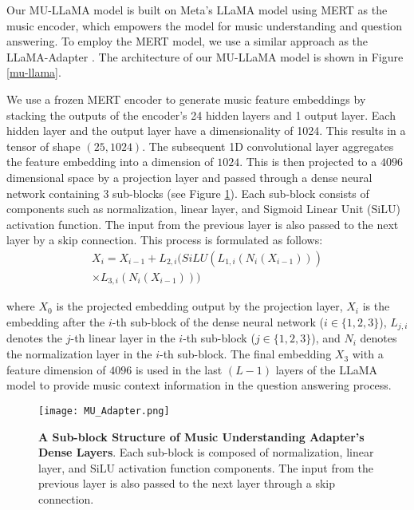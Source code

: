 \documentclass{article}
\begin{document}
\noindent
Our MU-LLaMA model is built on Meta's LLaMA\cite{touvron2023llama,touvron2023llama2} model using MERT \cite{li2023mert} as the music encoder, which empowers the model for music understanding and question answering. To employ the MERT model, we use a similar approach as the LLaMA-Adapter \cite{zhang2023llamaadapter}. The architecture of our MU-LLaMA model is shown in Figure \ref{mu-llama}.

We use a frozen MERT encoder to generate music feature embeddings by stacking the outputs of the encoder's 24 hidden layers and 1 output layer. Each hidden layer and the output layer have a dimensionality of 1024. This results in a tensor of shape $(25, 1024)$. The subsequent 1D convolutional layer aggregates the feature embedding into a dimension of $1024$.  This is then projected to a $4096$ dimensional space by a projection layer and passed through a dense neural network containing 3 sub-blocks (see Figure \ref{mu-adapter}). Each sub-block consists of components such as normalization, linear layer, and Sigmoid Linear Unit (SiLU) activation function. The input from the previous layer is also passed to the next layer by a skip connection. This process is formulated as follows:
\vspace{-0.3cm}
\begin{multline*}
    X_{i} = X_{i-1} + L_{2,i}(SiLU(L_{1,i}(N_{i}(X_{i-1}))) \\ \times L_{3,i}(N_{i}(X_{i-1})))
\end{multline*}
\vspace{-0.5cm}

\noindent
where $X_0$ is the projected embedding output by the projection layer, $X_{i}$ is the embedding after the $i$-th sub-block of the dense neural network ($i\in\{1,2,3\}$), $L_{j,i}$ denotes the $j$-th linear layer in the $i$-th sub-block ($j\in\{1,2,3\}$), and $N_i$ denotes the normalization layer in the $i$-th sub-block. The final embedding $X_3$ with a feature dimension of $4096$ is used in the last $(L-1)$ layers of the LLaMA model to provide music context information in the question answering process.

\vspace{-0.2cm}
\begin{figure}[H]
\centering
\texttt{[image: MU\_Adapter.png]}
\caption{\textbf{A Sub-block Structure of Music Understanding Adapter's Dense Layers}. Each sub-block is composed of normalization, linear layer, and SiLU activation function components. The input from the previous layer is also passed to the next layer through a skip connection.}
\label{mu-adapter}
\end{figure}
\vspace{-0.3cm}
\end{document}
